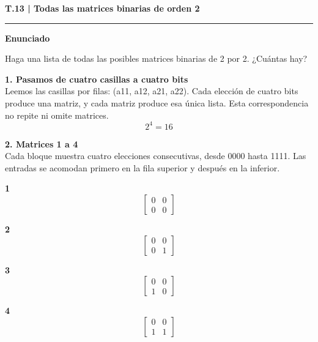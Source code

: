 \documentclass[11pt,a4paper,landscape]{article}
\newcommand{\titulo}[1]{{\LARGE\bfseries #1}\par\smallskip\hrule\medskip}
\begin{document}
\normalsize
\newpage{}\hypertarget{1.2-T.13}{}
\titulo{T.13 | Todas las matrices binarias de orden 2}
\textbf{Enunciado}\par Haga una lista de todas las posibles matrices binarias de 2 por 2. ¿Cuántas hay?
\par\medskip\large
\noindent\begin{minipage}{\linewidth}\textbf{1. Pasamos de cuatro casillas a cuatro bits}\\[2pt]Leemos las casillas por filas: (a11, a12, a21, a22). Cada elección de cuatro bits produce una matriz, y cada matriz produce esa única lista. Esta correspondencia no repite ni omite matrices.
\[2^4=16\]
\end{minipage}\par\medskip
\noindent\begin{minipage}{\linewidth}\textbf{2. Matrices 1 a 4}\\[2pt]Cada bloque muestra cuatro elecciones consecutivas, desde 0000 hasta 1111. Las entradas se acomodan primero en la fila superior y después en la inferior.
\par\smallskip \begin{minipage}[t]{.47\linewidth}\centering \textbf{1}\[\begin{bmatrix}0 & 0\\0 & 0\end{bmatrix}\]\end{minipage}\hfill\begin{minipage}[t]{.47\linewidth}\centering \textbf{2}\[\begin{bmatrix}0 & 0\\0 & 1\end{bmatrix}\]\end{minipage}\par\smallskip
\par\smallskip \begin{minipage}[t]{.47\linewidth}\centering \textbf{3}\[\begin{bmatrix}0 & 0\\1 & 0\end{bmatrix}\]\end{minipage}\hfill\begin{minipage}[t]{.47\linewidth}\centering \textbf{4}\[\begin{bmatrix}0 & 0\\1 & 1\end{bmatrix}\]\end{minipage}\par\smallskip
\end{minipage}\par\medskip
\end{document}
